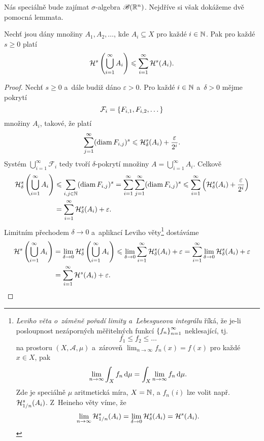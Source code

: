 Nás speciálně bude zajímat $\sigma$-algebra $\borelsigmaalgebra(\R^n)$. Nejdříve si však dokážeme dvě pomocná lemmata.
\begin{lemma}\label{lem:Hausdorffova-mira-subaditivita}
    Nechť jsou dány množiny $A_1,A_2,\ldots$, kde $A_i\subseteq X$ pro každé $i\in\N$. Pak pro každé $s\geqslant 0$ platí
    \[\hausdorffmeasure{s}\left(\bigcup_{i=1}^\infty A_i\right)\leqslant\sum_{i=1}^{\infty}\hausdorffmeasure{s}(A_i).\]
\end{lemma}
\begin{proof}
    Nechť $s\geqslant 0$ a~dále budiž dáno $\varepsilon>0$. Pro každé $i\in\N$ a~$\delta>0$ mějme pokrytí
    \[\mathcal{F}_i=\set{F_{i,1},F_{i,2},\dots}\]
    množiny $A_i$, takové, že platí
    \[\sum_{j=1}^{\infty}(\diam{F_{i,j}})^s\leqslant\hausdorffdeltameasure{s}{\delta}(A_i)+\dfrac{\varepsilon}{2^i}.\]
    Systém $\bigcup_{i=1}^\infty\mathcal{F}_i$ tedy tvoří $\delta$-pokrytí množiny $A=\bigcup_{i=1}^\infty A_i$. Celkově
    \begin{align*}
        \hausdorffdeltameasure{s}{\delta}\left(\bigcup_{i=1}^\infty A_i\right)&\leqslant\sum_{i,j\in\N}(\diam{F_{i,j}})^s=\sum_{i=1}^{\infty}\sum_{j=1}^{\infty}(\diam{F_{i,j}})^s\leqslant\sum_{i=1}^{\infty}\left(\hausdorffdeltameasure{s}{\delta}(A_i)+\dfrac{\varepsilon}{2^i}\right)\\
        &=\sum_{i=1}^{\infty}\hausdorffdeltameasure{s}{\delta}(A_i)+\varepsilon.
    \end{align*}
    Limitním přechodem $\delta\to 0$ a~aplikací Leviho věty\footnote{\emph{Leviho věta o~záměně pořadí limity a~Lebesgueova integrálu} říká, že je-li posloupnost nezáporných měřitelných funkcí $\set{f_n}_{n=1}^\infty$ neklesající, tj.
    \[f_1\leqslant f_2\leqslant\dots\]
    na prostoru $(X,\mathcal{A},\mu)$ a~zároveň $\lim_{n\to\infty}f_n(x)=f(x)$ pro každé $x\in X$, pak
    \[\lim_{n\to\infty}\int_X f_n\dx[\mu]=\int_X \lim_{n\to\infty}f_n\dx[\mu].\]
    Zde je speciálně $\mu$ aritmetická míra, $X=\N$, a $f_n(i)$ lze volit např. $\hausdorffdeltameasure{s}{1/n}(A_i)$. Z~Heineho věty víme, že
    \[\lim_{n\to\infty}\hausdorffdeltameasure{s}{1/n}(A_i)=\lim_{\delta\to 0}\hausdorffdeltameasure{s}{\delta}(A_i)=\hausdorffmeasure{s}(A_i).\]
    }
    dostáváme
    \begin{align*}
        \hausdorffmeasure{s}\left(\bigcup_{i=1}^\infty A_i\right)&=\lim_{\delta\to 0}\hausdorffdeltameasure{s}{\delta}\left(\bigcup_{i=1}^\infty A_i\right)\leqslant\lim_{\delta\to 0}\sum_{i=1}^{\infty}\hausdorffdeltameasure{s}{\delta}(A_i)+\varepsilon=\sum_{i=1}^{\infty}\lim_{\delta\to 0}\hausdorffdeltameasure{s}{\delta}(A_i)+\varepsilon\\
        &=\sum_{i=1}^{\infty}\hausdorffmeasure{s}(A_i)+\varepsilon.
    \end{align*} 
\end{proof}
